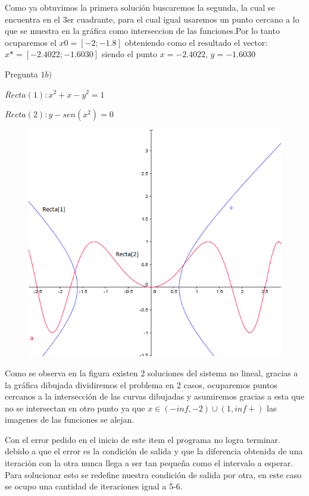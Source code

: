 \documentclass{udparticle}
\begin{document}
\begin{enumerate}
            Como ya obtuvimos la primera solución buscaremos la segunda, la cual se encuentra en el 3er cuadrante, para el cual igual usaremos un punto cercano a lo que se muestra en la gráfica como interseccion de las funciones.Por lo tanto ocuparemos el $x0=[-2;-1.8] $ obteniendo como el resultado el vector:
            $x*=[-2.4022;-1.6030]$ siendo el punto $x=-2.4022$, $y=-1.6030$

        \newpage    
        Pregunta $ 1b)$
        
            $ Recta(1) : x^2 + x -y^2=1 $
            
            $ Recta(2) : y-sen(x^2)=0  $
            
            \begin{figure}[h] \centering
            \includegraphics[width=12cm]{GraficoEcEj1b}
            \end{figure}
        Como se observa en la figura existen 2 soluciones del sistema no lineal, gracias a la gráfica dibujada dividiremos el problema en 2 casos, ocuparemos puntos cercanos a la intersección de las curvas dibujadas y asumiremos gracias a esta que no se intersectan en otro punto ya que  $ x \in (-inf,-2) \cup (1,inf+)$ las imagenes de las funciones se alejan.
        
        Con el error pedido en el inicio de este item el programa no logra terminar. debido a que el error es la condición de salida y que la diferencia  obtenida de una iteración con la otra nunca llega a ser tan pequeña como el intervalo a esperar. Para solucionar esto se redefine nuestra condición de salida por otra, en este caso se ocupo una cantidad de iteraciones igual a 5-6.
        

\end{enumerate}
\end{document}
